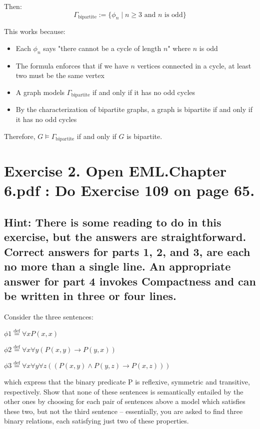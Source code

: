 \documentclass{article}
\newenvironment{proof}
{\begin{mdframed}[linewidth=0.5pt]\begin{enumerate}[label=\arabic*.,leftmargin=*]}
{\end{enumerate}\end{mdframed}}
\newcommand{\defeq}{\stackrel{\text{def}}{=}}
\begin{document}
    Then:
    \[
    \Gamma_{\text{bipartite}} := \{\phi_n \mid n \geq 3 \text{ and } n \text{ is odd}\}
    \]
    
    This works because:
\begin{proof}
    
    \begin{itemize}
        \item Each $\phi_n$ says "there cannot be a cycle of length $n$" where $n$ is odd
        \item The formula enforces that if we have $n$ vertices connected in a cycle, at least two must be the same vertex
        \item A graph models $\Gamma_{\text{bipartite}}$ if and only if it has no odd cycles
        \item By the characterization of bipartite graphs, a graph is bipartite if and only if it has no odd cycles
    \end{itemize}
    
    Therefore, $G \models \Gamma_{\text{bipartite}}$ if and only if $G$ is bipartite.
\end{proof}


\newpage



\section*{Exercise 2. Open EML.Chapter 6.pdf : Do Exercise 109 on page 65.}

\subsection*{Hint: There is some reading to do in this exercise, but the answers are straightforward. Correct
answers for parts 1, 2, and 3, are each no more than a single line. An appropriate answer for part 4
invokes Compactness and can be written in three or four lines.}


\begin{mdframed}
    Consider the three sentences:
    
    \vspace{1em}
    $\phi1 \defeq \forall x P (x, x)$
    
    \vspace{1em}
    $\phi2 \defeq \forall x \forall y (P (x, y) \rightarrow P (y, x))$
    
    \vspace{1em}
    $\phi3 \defeq \forall x \forall y \forall z ((P (x, y) \land P (y, z) \rightarrow P (x, z)))$
    
    \vspace{1em}

    which express that the binary predicate P is reﬂexive, symmetric and transitive,
    respectively. Show that none of these sentences is semantically entailed by the
    other ones by choosing for each pair of sentences above a model which satisﬁes
    these two, but not the third sentence – essentially, you are asked to ﬁnd three
    binary relations, each satisfying just two of these properties. 
  
\end{mdframed}
\end{document}
